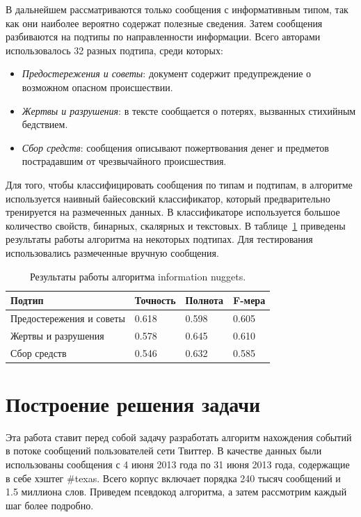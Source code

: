 \documentclass[12pt, a4paper]{article}
\begin{document}
	В дальнейшем рассматриваются только сообщения с информативным типом, так как они наиболее вероятно содержат полезные сведения. Затем сообщения разбиваются на подтипы по направленности информации. Всего авторами использовалось 32 разных подтипа, среди которых:
	\begin{itemize}
	\item\emph{Предостережения и советы}: документ содержит предупреждение о возможном опасном происшествии.
	\item\emph{Жертвы и разрушения}: в тексте сообщается о потерях, вызванных стихийным бедствием.
	\item\emph{Сбор средств}: сообщения описывают пожертвования денег и предметов пострадавшим от чрезвычайного происшествия.
	\end{itemize}
	
	Для того, чтобы классифицировать сообщения по типам и подтипам, в алгоритме используется наивный байесовский классификатор, который предварительно тренируется на размеченных данных. В классификаторе используется большое количество свойств, бинарных, скалярных и текстовых. В таблице~\ref{nuggets-table} приведены результаты работы алгоритма на некоторых подтипах. Для тестирования использовались размеченные вручную сообщения.
	\begin{table}[h]
	\centering
	\begin{tabular}{ | l | l | l | l | }
	\hline
	Подтип & Точность & Полнота & F-мера \\ \hline
	Предостережения и советы & 0.618 & 0.598 & 0.605 \\ \hline
	Жертвы и разрушения & 0.578 & 0.645 & 0.610 \\ \hline
	Сбор средств & 0.546 & 0.632 & 0.585 \\ \hline
	\end{tabular}
	\caption{Результаты работы алгоритма information nuggets.}
	\label{nuggets-table}
	\end{table}
  
  \section{Построение решения задачи}
  Эта работа ставит перед собой задачу разработать алгоритм нахождения событий в потоке сообщений пользователей сети Твиттер. В качестве данных были использованы сообщения с 4 июня 2013 года по 31 июня 2013 года, содержащие в себе хэштег \#texas. Всего корпус включает порядка 240 тысяч сообщений и 1.5 миллиона слов. Приведем псевдокод алгоритма, а затем рассмотрим каждый шаг более подробно. 
  
\end{document}
